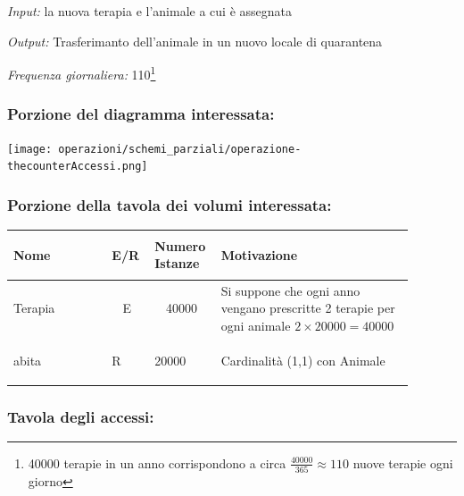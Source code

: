 \documentclass[12pt,a4paper]{article}
\begin{document}
\noindent\textit{Input:} la nuova terapia e l'animale a cui è assegnata

\noindent\textit{Output:} Trasferimanto dell'animale in un nuovo locale di quarantena

\noindent\textit{Frequenza giornaliera:} 110\footnote{40000 terapie in un anno corrispondono a circa $\frac{40000}{365}\approx 110$ nuove terapie ogni giorno}

\subsubsection*{Porzione del diagramma interessata:}

\texttt{[image: operazioni/schemi\_parziali/operazione-\\thecounterAccessi.png]} 
\subsubsection*{Porzione della tavola dei volumi interessata:}
\begin{center}\setlength{\extrarowheight}{1.5pt}\begin{longtable}{|p{0.23\linewidth}|p{0.1\linewidth}|p{0.11\linewidth}|p{0.45\linewidth}|}
\hline \textbf{Nome}   & \begin{center}\vspace{-15pt}\textbf{E/R}\end{center} & \textbf{Numero Istanze} & \textbf{Motivazione}\\ 
\hline
Terapia
 & 
\multicolumn{1}{|c|}{E}
 & 
\multicolumn{1}{|c|}{40000}
 & 
Si suppone che ogni anno vengano prescritte 2 terapie per ogni animale $2\times 20000= 40000$
\\

\hline
abita 				& \begin{center}
\vspace{-25pt}R
\end{center}
					& \begin{center}
					\vspace{-25pt}20000\end{center}
					&  Cardinalità (1,1) con Animale \\ 

\hline

\end{longtable}\end{center}
\subsubsection*{Tavola degli accessi:}
\end{document}
